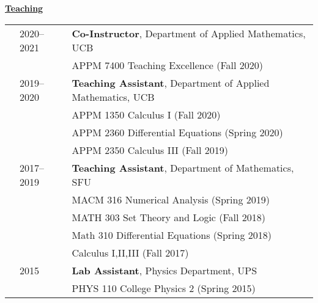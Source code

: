 \documentclass[letterpaper,11pt,oneside]{article}
\newcommand{\headr}[1]{\uline{\Large{\textbf{#1}} \hfill } \\ \vspace{-0.5cm}}
\begin{document}
\headr{Teaching}
\begin{tabular}{p{0.01cm} p{4.5cm} p{12cm}}
& 2020--2021 & \textbf{Co-Instructor}, Department of Applied Mathematics, UCB \\
&     & APPM 7400 Teaching Excellence (Fall 2020)\\ \vspace{-0.75cm}
& 2019-- 2020 & \textbf{Teaching Assistant}, Department of Applied Mathematics, UCB \\
&     & APPM 1350 Calculus I (Fall 2020)\\
&     & APPM 2360 Differential Equations (Spring 2020)\\
&     & APPM 2350 Calculus III (Fall 2019)\\
& 2017--2019  & \textbf{Teaching Assistant}, Department of Mathematics, SFU  \\
&     & MACM 316 Numerical Analysis (Spring 2019) \\
&     & MATH 303 Set Theory and Logic (Fall 2018) \\ 
&     & Math 310 Differential Equations (Spring 2018) \\ 
&     & Calculus I,II,III (Fall 2017)\\
& 2015  &\textbf{Lab Assistant}, Physics Department, UPS \\
&     & PHYS 110 College Physics 2 (Spring 2015) \\
\end{tabular}
\end{document}
